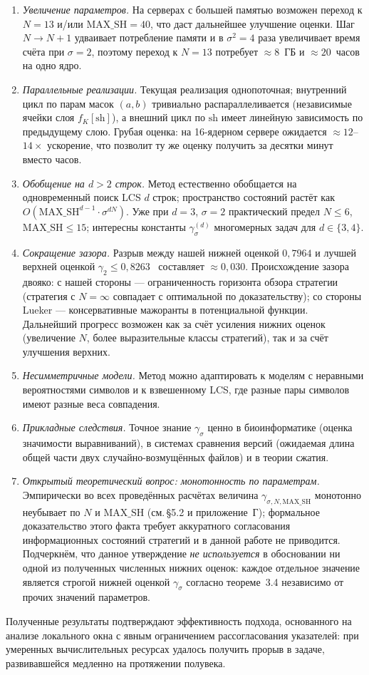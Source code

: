 \begin{enumerate}
    \item \emph{Увеличение параметров.} На серверах с большей памятью возможен переход к $N = 13$ и/или $\mathrm{MAX\_SH} = 40$, что даст дальнейшее улучшение оценки. Шаг $N \to N+1$ удваивает потребление памяти и в $\sigma^2 = 4$ раза увеличивает время счёта при $\sigma = 2$, поэтому переход к $N = 13$ потребует $\approx 8$~ГБ и $\approx 20$~часов на одно ядро.
    \item \emph{Параллельные реализации.} Текущая реализация однопоточная; внутренний цикл по парам масок $(a, b)$ тривиально распараллеливается (независимые ячейки слоя $f_K[\mathrm{sh}]$), а внешний цикл по $\mathrm{sh}$ имеет линейную зависимость по предыдущему слою. Грубая оценка: на 16-ядерном сервере ожидается $\approx 12$--$14\times$ ускорение, что позволит ту же оценку получить за десятки минут вместо часов.
    \item \emph{Обобщение на $d > 2$ строк.} Метод естественно обобщается на одновременный поиск LCS $d$ строк; пространство состояний растёт как $O(\mathrm{MAX\_SH}^{d-1} \cdot \sigma^{dN})$. Уже при $d = 3$, $\sigma = 2$ практический предел $N \leq 6$, $\mathrm{MAX\_SH} \leq 15$; интересны константы $\gamma_\sigma^{(d)}$ многомерных задач для $d \in \{3, 4\}$.
    \item \emph{Сокращение зазора.} Разрыв между нашей нижней оценкой $0{,}7964$ и лучшей верхней оценкой $\gamma_2 \leq 0{,}8263$~\cite{lueker2009} составляет $\approx 0{,}030$. Происхождение зазора двояко: с нашей стороны --- ограниченность горизонта обзора стратегии (стратегия с $N = \infty$ совпадает с оптимальной по доказательству); со стороны Lueker --- консервативные мажоранты в потенциальной функции. Дальнейший прогресс возможен как за счёт усиления нижних оценок (увеличение $N$, более выразительные классы стратегий), так и за счёт улучшения верхних.
    \item \emph{Несимметричные модели.} Метод можно адаптировать к моделям с неравными вероятностями символов и к взвешенному LCS, где разные пары символов имеют разные веса совпадения.
    \item \emph{Прикладные следствия.} Точное знание $\gamma_\sigma$ ценно в биоинформатике (оценка значимости выравниваний), в системах сравнения версий (ожидаемая длина общей части двух случайно-возмущённых файлов) и в теории сжатия.
    \item \emph{Открытый теоретический вопрос: монотонность по параметрам.} Эмпирически во всех проведённых расчётах величина $\gamma_{\sigma, N, \mathrm{MAX\_SH}}$ монотонно неубывает по $N$ и $\mathrm{MAX\_SH}$ (см.\,\S5.2 и приложение~Г); формальное доказательство этого факта требует аккуратного согласования информационных состояний стратегий и в данной работе не приводится. Подчеркнём, что данное утверждение \emph{не используется} в обосновании ни одной из полученных численных нижних оценок: каждое отдельное значение является строгой нижней оценкой $\gamma_\sigma$ согласно теореме~3.4 независимо от прочих значений параметров.
\end{enumerate}

Полученные результаты подтверждают эффективность подхода, основанного на анализе локального окна с явным ограничением рассогласования указателей: при умеренных вычислительных ресурсах удалось получить прорыв в задаче, развивавшейся медленно на протяжении полувека.
